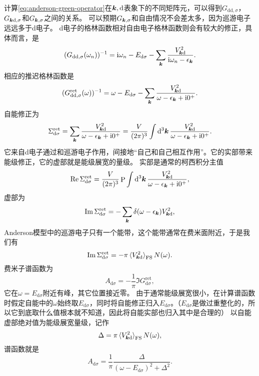 \documentclass[hyperref, UTF8, a4paper]{ctexart}
\DeclareMathOperator{\primevalue}{P}
\newcommand*{\ii}{\mathrm{i}}
\begin{document}
计算\eqref{eq:anderson-green-operator}在$\vb*{k}, \text{d}$表象下的不同矩阵元，可以得到$G_{\text{dd}, \sigma}$，$G_{\vb*{k} \text{d}, \sigma}$和$G_{\vb*{k}, \sigma}$之间的关系。
可以预期$G_{\vb*{k}, \sigma}$和自由情况不会差太多，因为巡游电子远远多于d电子。
d电子的格林函数相对自由电子格林函数则会有较大的修正，具体而言，是
\begin{equation}
    (G_{\text{dd}, \sigma}(\omega_n))^{-1} = \ii \omega_n - E_{\text{d}\sigma} - \sum_{\vb*{k}} \frac{V_{\vb*{k}\text{d}}^2}{\ii \omega_n - \epsilon_{\vb*{k}}}.
\end{equation}
相应的推迟格林函数是
\begin{equation}
    (G_{\text{dd}, \sigma}^\text{ret}(\omega))^{-1} = \omega - E_{\text{d}\sigma} - \sum_{\vb*{k}} \frac{V_{\vb*{k}\text{d}}^2}{\omega - \epsilon_{\vb*{k}} + \ii 0^+}.
\end{equation}
自能修正为
\begin{equation}
    \Sigma_{\text{d} \sigma}^\text{ret} = \sum_{\vb*{k}} \frac{V_{\vb*{k}\text{d}}^2}{\omega - \epsilon_{\vb*{k}} + \ii 0^+} = \frac{V}{(2\pi)^3} \int \dd[3]{\vb*{k}} \frac{V_{\vb*{k}\text{d}}^2}{\omega - \epsilon_{\vb*{k}} + \ii 0^+}.
\end{equation}
它来自d电子通过和巡游电子作用，间接地“自己和自己相互作用”。它的实部带来能级修正，它的虚部就是能级展宽的量级。
实部是通常的柯西积分主值
\[
    \Re \Sigma_{\text{d} \sigma}^\text{ret} = \frac{V}{(2\pi)^3} \primevalue \int \dd[3]{\vb*{k}} \frac{V_{\vb*{k}\text{d}}^2}{\omega - \epsilon_{\vb*{k}} + \ii 0^+},
\]
虚部为
\[
    \Im \Sigma_{\text{d} \sigma}^\text{ret} = - \sum_{\vb*{k}} \delta(\omega - \epsilon_{\vb*{k}}) V_{\vb*{k} \text{d}}^2, 
\]
Anderson模型中的巡游电子只有一个能带，这个能带通常在费米面附近，于是我们有
\[
    \Im \Sigma_{\text{d} \sigma}^\text{ret} = - \pi \expval*{V_{\vb*{k} \text{d}}^2}_\text{FS} N(\omega).
\]
费米子谱函数为
\[
    A_{\text{d} \sigma} = -\frac{1}{\pi} \Im G_{\text{d} \sigma}^\text{ret},
\]
它在$\omega = E_{\text{d} \sigma}$附近有峰，其它位置接近零。
由于通常能级展宽很小，在计算谱函数时假定自能中的$\omega$始终取$E_{\text{d} \sigma}$，同时将自能修正归入$E_{\text{d} \sigma}$。（$E_{\text{d} \sigma}$是做过重整化的，所以它到底取什么值根本就不知道，因此将自能实部也归入其中是合理的）
以自能虚部绝对值为能级展宽量级，记作
\begin{equation}
    \Delta = \pi \expval*{V_{\vb*{k} \text{d}}^2}_\text{FS} N(\omega),
\end{equation}
谱函数就是
\begin{equation}
    A_{\text{d}\sigma} = \frac{1}{\pi} \frac{\Delta}{(\omega-E_{\text{d}\sigma})^2 + \Delta^2}.
    \label{eq:anderson-spectral}
\end{equation}
\end{document}
